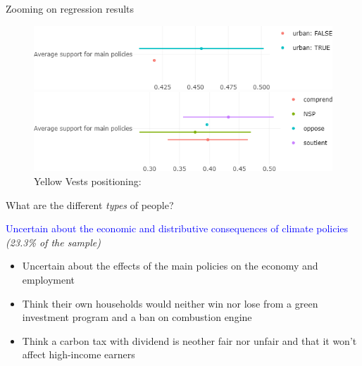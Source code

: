 \begin{framefont}{\small}
\begin{frame}{Zooming on regression results}
\begin{figure}[h!]	
	\caption{Effects of living in an urban ``Grand Pôle'' and position on the Yellow Vests, on support for main policies, conditional on socio-demographics (set A) and energy characteristics (B).}
	\includegraphics[width=.7\textwidth]{../figures/FR/policies_support_by_urban.png}
	\vspace{0.8cm}
	\caption{Yellow Vests positioning:}
	\includegraphics[width=.7\textwidth]{../figures/FR/policies_support_by_Gilets_jaunes_agg.png}
\end{figure}
\end{frame}


\begin{frame}{What are the different \textit{types} of people?}
\begin{itemize}
\ip \textcolor{blue}{Uncertain about the economic and distributive consequences of climate policies} \textit{(23.3\% of the sample)}
	\begin{itemize}
		\item Uncertain about the effects of the main policies on the economy and employment
		\item Think their own households would neither win nor lose from a green investment program and a ban on combustion engine
		\item Think a carbon tax with dividend is neother fair nor unfair and that it won't affect high-income earners
	\end{itemize}


\end{itemize}
\end{frame}
\end{framefont}
